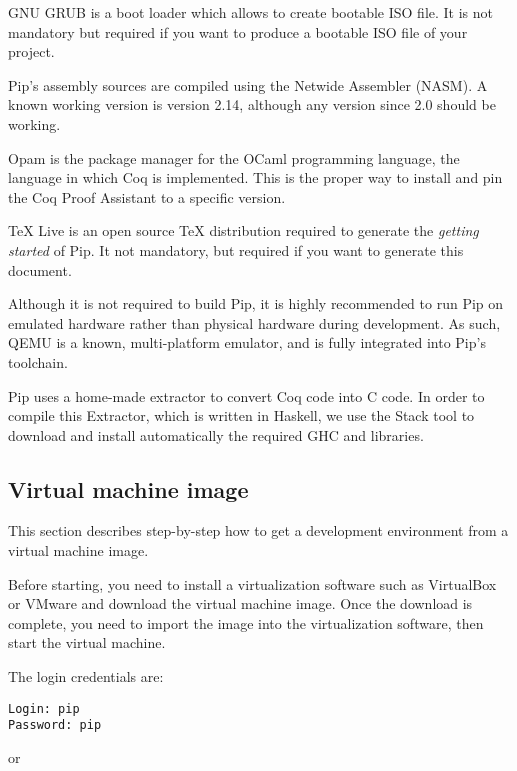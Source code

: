 \documentclass[10pt,a4paper,titlepage]{refart}
\begin{document}
 
GNU GRUB is a boot loader which allows to create bootable ISO file. It is not
mandatory but required if you want to produce a bootable ISO file of your
project.

 
Pip's assembly sources are compiled using the Netwide Assembler (NASM). A known
working version is version 2.14, although any version since 2.0 should be
working.

 
Opam is the package manager for the OCaml programming language, the language in
which Coq is implemented. This is the proper way to install and pin the Coq
Proof Assistant to a specific version.

 
TeX Live is an open source TeX distribution required to generate the
\textit{getting started} of Pip. It not mandatory, but required if you want to
generate this document.

 
Although it is not required to build Pip, it is highly recommended to run Pip on
emulated hardware rather than physical hardware during development. As such,
QEMU is a known, multi-platform emulator, and is fully integrated into Pip's
toolchain.

 
Pip uses a home-made extractor to convert Coq code into C code. In order to
compile this Extractor, which is written in Haskell, we use the Stack tool to
download and install automatically the required GHC and libraries.

\subsection{Virtual machine image}

This section describes step-by-step how to get a development environment from a
virtual machine image.

Before starting, you need to install a virtualization software such as
VirtualBox or VMware and download the virtual machine image. Once the download
is complete, you need to import the image into the virtualization software, then
start the virtual machine.

The login credentials are:

\begin{lstlisting}
Login: pip
Password: pip
\end{lstlisting}

or
\end{document}
